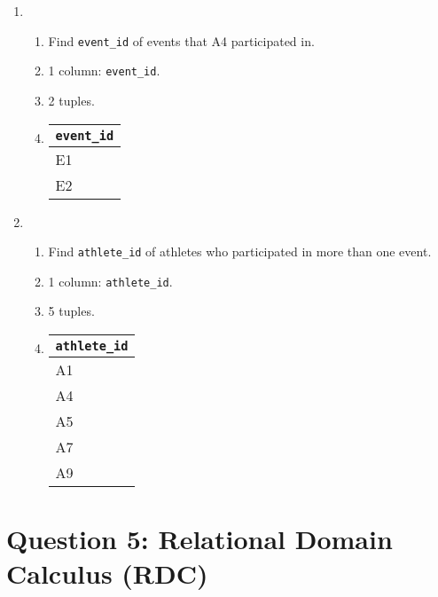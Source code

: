 \documentclass{article}
\begin{document}
\begin{enumerate}
    \item
    \begin{enumerate}
        \item Find \texttt{event\_id} of events that A4 participated in.
        \item 1 column: \texttt{event\_id}.
        \item 2 tuples.
        \item 
        \begin{tabular}{@{}l@{}}
            \toprule
            \texttt{event\_id} \\ \midrule
            E1          \\
            E2          \\ \bottomrule
        \end{tabular}
    \end{enumerate}

    \item \begin{enumerate}
        \item Find \texttt{athlete\_id} of athletes who participated in more than one event.
        \item 1 column: \texttt{athlete\_id}.
        \item 5 tuples.
        \item
        \begin{tabular}{@{}l@{}}
            \toprule
            \texttt{athlete\_id} \\ \midrule
            A1          \\
            A4          \\
            A5          \\
            A7          \\
            A9          \\ \bottomrule
        \end{tabular}
    \end{enumerate}
\end{enumerate}
\newpage

\section*{Question 5: Relational Domain Calculus (RDC)}
\end{document}
